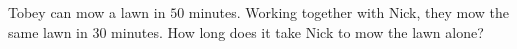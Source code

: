 Tobey can mow a lawn in $50$ minutes. Working together with Nick, they mow the same lawn in $30$ minutes. How long does it take Nick to mow the lawn alone?

